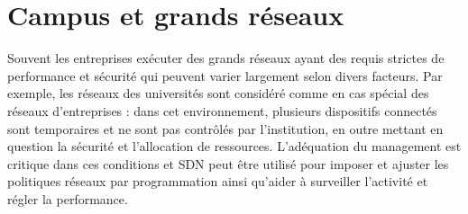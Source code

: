 


\section{Campus et grands réseaux}

Souvent les entreprises exécuter des grands réseaux ayant des requis strictes de performance et sécurité qui peuvent varier largement selon divers facteurs. Par exemple, les réseaux des universités sont considéré comme en cas spécial des réseaux d'entreprises : dans cet environnement, plusieurs dispositifs connectés sont temporaires et ne sont pas contrôlés par l'institution, en outre mettant en question la sécurité et l'allocation de ressources. L'adéquation du management est critique dans ces conditions et SDN peut être utilisé pour imposer et ajuster les politiques réseaux par programmation ainsi qu'aider à surveiller l'activité et régler la performance.


